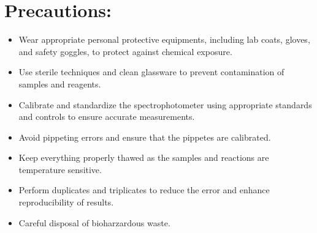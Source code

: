 \documentclass{report}
\begin{document}
\section*{Precautions:}

\begin{itemize}
  \item Wear appropriate personal protective equipments, including lab coats, gloves, and safety goggles,
         to protect against chemical exposure.
  \item Use sterile techniques and clean glassware to prevent contamination of samples and reagents.
  \item Calibrate and standardize the spectrophotometer using appropriate standards and 
         controls to ensure accurate measurements.
  \item Avoid pippeting errors and ensure that the pippetes are calibrated.
  \item Keep everything properly thawed as the samples and reactions are temperature sensitive.
  \item Perform duplicates and triplicates to reduce the error and enhance reproducibility of results.
  \item Careful disposal of bioharzardous waste.
\end{itemize}
\end{document}
